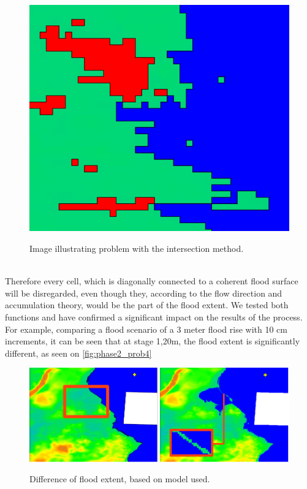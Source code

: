 \begin{figure}[h!]
\centering
	{\includegraphics[width=0.75\linewidth]{gfx/Phase_2/problem3.png}}
\caption{Image illustrating problem with the intersection method.}
\label{fig:phase2_prob3}
\end{figure}\\

Therefore every cell, which is diagonally connected to a coherent flood surface will be disregarded, even though they, according to the flow direction and accumulation theory, would be the part of the flood extent. 
We tested both functions and have confirmed a significant impact on the results of the process. For example, comparing a flood scenario of a 3 meter flood rise with 10 cm increments, it can be seen that at stage 1,20m, the flood extent is significantly different, as seen on \autoref{fig:phase2_prob4}

\begin{figure}[h!]
\centering
	{\includegraphics[width=\linewidth]{gfx/Phase_2/problem4.png}}
\caption{Difference of flood extent, based on model used.}
\label{fig:phase2_prob4}
\end{figure}\\


